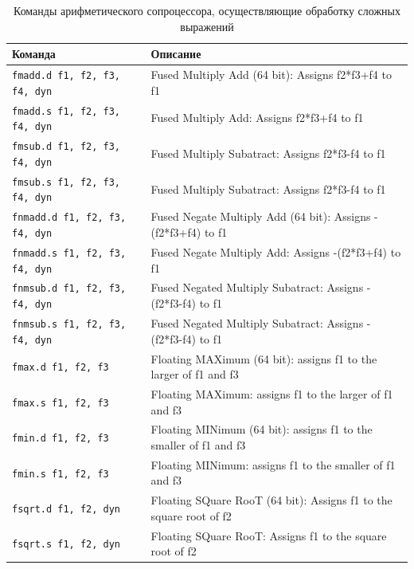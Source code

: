 \begin{table}[h]
    \caption{Команды арифметического сопроцессора, осуществляющие обработку сложных выражений}
    \centering
    \begin{tabularx}{\textwidth}{|l|X|}
        \hline
        \textbf{Команда} & \textbf{Описание} \\
        \hline \verb|fmadd.d f1, f2, f3, f4, dyn| & Fused Multiply Add (64 bit): Assigns f2*f3+f4 to f1 \\
        \hline \verb|fmadd.s f1, f2, f3, f4, dyn| & Fused Multiply Add: Assigns f2*f3+f4 to f1 \\
        \hline \verb|fmsub.d f1, f2, f3, f4, dyn| & Fused Multiply Subatract: Assigns f2*f3-f4 to f1 \\
        \hline \verb|fmsub.s f1, f2, f3, f4, dyn| & Fused Multiply Subatract: Assigns f2*f3-f4 to f1 \\
        \hline \verb|fnmadd.d f1, f2, f3, f4, dyn| & Fused Negate Multiply Add (64 bit): Assigns -(f2*f3+f4) to f1 \\
        \hline \verb|fnmadd.s f1, f2, f3, f4, dyn| & Fused Negate Multiply Add: Assigns -(f2*f3+f4) to f1 \\
        \hline \verb|fnmsub.d f1, f2, f3, f4, dyn| & Fused Negated Multiply Subatract: Assigns -(f2*f3-f4) to f1 \\
        \hline \verb|fnmsub.s f1, f2, f3, f4, dyn| & Fused Negated Multiply Subatract: Assigns -(f2*f3-f4) to f1 \\
        \hline \verb|fmax.d f1, f2, f3| & Floating MAXimum (64 bit): assigns f1 to the larger of f1 and f3 \\
        \hline \verb|fmax.s f1, f2, f3| & Floating MAXimum: assigns f1 to the larger of f1 and f3 \\
        \hline \verb|fmin.d f1, f2, f3| & Floating MINimum (64 bit): assigns f1 to the smaller of f1 and f3 \\
        \hline \verb|fmin.s f1, f2, f3| & Floating MINimum: assigns f1 to the smaller of f1 and f3 \\
        \hline \verb|fsqrt.d f1, f2, dyn| & Floating SQuare RooT (64 bit): Assigns f1 to the square root of f2 \\
        \hline \verb|fsqrt.s f1, f2, dyn| & Floating SQuare RooT: Assigns f1 to the square root of f2 \\
        \hline
    \end{tabularx}
    \label{table-fp-processor-complex}
\end{table}

